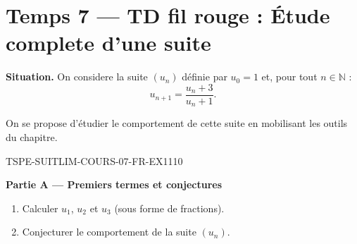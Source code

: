 
\section*{Temps 7 — TD fil rouge : Étude complete d'une suite}

\textbf{Situation.} On considere la suite $(u_n)$ définie par $u_0 = 1$ et, pour tout $n \in \mathbb{N}$ :
\[
  u_{n+1} = \frac{u_n + 3}{u_n + 1}.
\]

On se propose d'étudier le comportement de cette suite en mobilisant les outils du chapitre.

\bigskip


\begin{exercice}{TSPE-SUITLIM-COURS-07-FR-EX1}{1}{10}

\textbf{Partie A — Premiers termes et conjectures}

\begin{enumerate}
  \item Calculer $u_1$, $u_2$ et $u_3$ (sous forme de fractions).
  \item Conjecturer le comportement de la suite $(u_n)$.
\end{enumerate}

\end{exercice}

